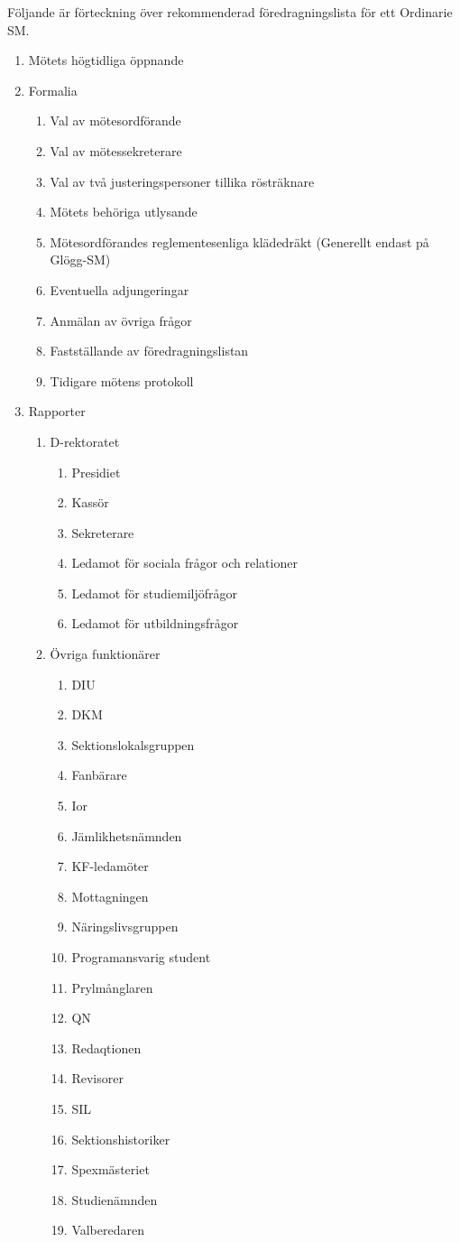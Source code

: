 \documentclass[a4paper,12pt]{article}
\begin{document}
Följande är förteckning över rekommenderad föredragningslista för ett Ordinarie SM.

\begin{enumerate}
  \item Mötets högtidliga öppnande
  \item Formalia\begin{enumerate}
  \item Val av mötesordförande
  \item Val av mötessekreterare
  \item Val av två justeringspersoner tillika rösträknare
  \item Mötets behöriga utlysande
  \item Mötesordförandes reglementesenliga klädedräkt (Generellt endast på Glögg-SM)
  \item Eventuella adjungeringar
  \item Anmälan av övriga frågor
  \item Fastställande av föredragningslistan
  \item Tidigare mötens protokoll
\end{enumerate}


  \item Rapporter\begin{enumerate}
  \item D-rektoratet\begin{enumerate}
  \item Presidiet
  \item Kassör
  \item Sekreterare
  \item Ledamot för sociala frågor och relationer
  \item Ledamot för studiemiljöfrågor
  \item Ledamot för utbildningsfrågor
\end{enumerate}


  \item Övriga funktionärer\begin{enumerate}
  \item DIU
  \item DKM
  \item Sektionslokalsgruppen
  \item Fanbärare
  \item Ior
  \item Jämlikhetsnämnden
  \item KF-ledamöter
  \item Mottagningen
  \item Näringslivsgruppen
  \item Programansvarig student
  \item Prylmånglaren
  \item QN
  \item Redaqtionen
  \item Revisorer
  \item SIL
  \item Sektionshistoriker
  \item Spexmästeriet
  \item Studienämnden
  \item Valberedaren
\end{enumerate}



\end{enumerate}
\end{enumerate}
\end{document}
